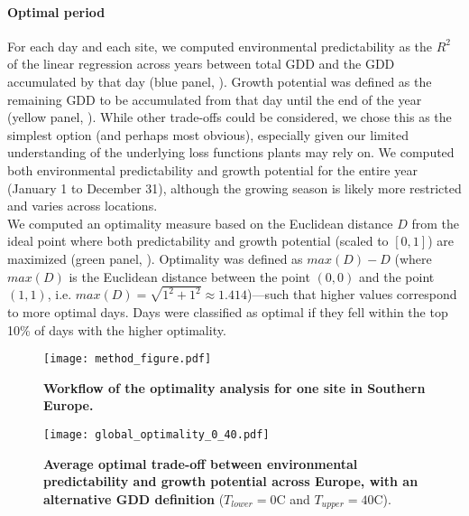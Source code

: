\documentclass[11pt,letter]{article}
\begin{document}
\paragraph{Optimal period} For each day and each site, we computed environmental predictability as the $R^2$ of the linear regression across years between total GDD and the GDD accumulated by that day (blue panel, ). Growth potential was defined as the remaining GDD to be accumulated from that day until the end of the year (yellow panel, ). While other trade-offs could be considered, we chose this as the simplest option (and perhaps most obvious), especially given our limited understanding of the underlying loss functions plants may rely on. We computed both environmental predictability and growth potential for the entire year (January 1 to December 31), although the growing season is likely more restricted and varies across locations. \\
We computed an optimality measure based on the Euclidean distance $D$ from  the ideal point where both predictability and growth potential (scaled to $[0,1]$) are maximized (green panel, ). Optimality was defined as $max(D)-D$ (where $max(D)$ is the Euclidean distance between the point $(0,0)$ and the point $(1,1)$, i.e. $max(D)=\sqrt{1^2+1^2}\approx1.414$)---such that higher values correspond to more optimal days. Days were classified as optimal if they fell within the top 10\% of days with the higher optimality.



\begin{figure}[hb]
\hspace*{-1.4cm}
\texttt{[image: method\_figure.pdf]}
\vspace*{-0.4cm}
\caption{\textbf{Workflow of the optimality analysis for one site in Southern Europe.}} %
\label{fig:method}
\end{figure}

\clearpage

\begin{figure}[h]
\centering
\texttt{[image: global\_optimality\_0\_40.pdf]} %
\vspace*{-0.4cm}
\caption{\textbf{Average optimal trade-off between environmental predictability and growth potential across Europe, with an alternative GDD definition} ($T_{lower}=0$\degree C and $T_{upper}=40$\degree C).}
\label{fig:altgdd}
\end{figure}
\end{document}

